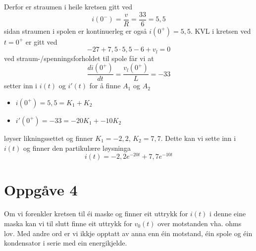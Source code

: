 \documentclass[12pt,a4paper]{article}
\begin{document}
    Derfor er straumen i heile kretsen gitt ved
    \begin{equation}
      i(0^-) = \frac{v}{R} = \frac{33}{6} = 5,5
    \end{equation}
    sidan straumen i spolen er kontinuerleg er også $i(0^+) = 5,5$. KVL i kretsen
    ved $t=0^+$ er gitt ved
    \begin{equation}
      -27 + 7,5\cdot5,5 - 6 + v_l = 0
    \end{equation}
    ved straum-/spenningsforholdet til spole får vi at
    \begin{equation}
      \frac{di(0^+)}{dt} = \frac{v_l(0^+)}{L} = -33
    \end{equation}
    setter inn i $i(t)$ og $i'(t)$ for å finne $A_1$ og $A_2$
    \begin{itemize}
      \item $i(0^+) = 5,5 = K_1 + K_2$
      \item $i'(0^+) = -33 = -20K_1 + -10K_2$
    \end{itemize}
    løyser likningssettet og finner $K_1 = -2,2$, $K_2 = 7,7$. Dette kan vi sette
    inn i $i(t)$ og finner den partikulære løysninga
    \begin{equation}
      i(t) = -2,2e^{-20t} + 7,7 e^{-10t}
    \end{equation}

  \newpage

  \section*{Oppgåve 4}
    Om vi forenkler kretsen til éi maske og finner eit uttrykk for $i(t)$ i denne 
    eine maska kan vi til slutt finne eit uttrykk for $v_0(t)$ over motstanden vha.
    ohms lov. Med andre ord er vi ikkje opptatt av anna enn éin motstand, éin spole
    og éin kondensator i serie med ein energikjelde.
    \bigskip
\end{document}
